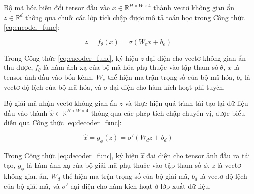 Bộ mã hóa biến đổi tensor đầu vào $x \in \mathbb{R}^{H \times W \times 4}$ thành vectơ không gian ẩn $z \in \mathbb{R}^d$ thông qua chuỗi các lớp tích chập được mô tả toán học trong Công thức \ref{eq:encoder_func}:

\begin{equation}
z = f_{\theta}(x) = \sigma(W_e x + b_e)
\label{eq:encoder_func}
\end{equation}

Trong Công thức \ref{eq:encoder_func}, ký hiệu $z$ đại diện cho vectơ không gian ẩn thu được, $f_{\theta}$ là hàm ánh xạ của bộ mã hóa phụ thuộc vào tập tham số $\theta$, $x$ là tensor ảnh đầu vào bốn kênh, $W_e$ thể hiện ma trận trọng số của bộ mã hóa, $b_e$ là vectơ độ lệch của bộ mã hóa, và $\sigma$ đại diện cho hàm kích hoạt phi tuyến.

Bộ giải mã nhận vectơ không gian ẩn $z$ và thực hiện quá trình tái tạo lại dữ liệu đầu vào thành $\hat{x} \in \mathbb{R}^{H \times W \times 4}$ thông qua các phép tích chập chuyển vị, được biểu diễn qua Công thức \ref{eq:decoder_func}:

\begin{equation}
\hat{x} = g_{\phi}(z) = \sigma'(W_d z + b_d)
\label{eq:decoder_func}
\end{equation}

Trong Công thức \ref{eq:decoder_func}, ký hiệu $\hat{x}$ đại diện cho tensor ảnh đầu ra tái tạo, $g_{\phi}$ là hàm ánh xạ của bộ giải mã phụ thuộc vào tập tham số $\phi$, $z$ là vectơ không gian ẩn, $W_d$ thể hiện ma trận trọng số của bộ giải mã, $b_d$ là vectơ độ lệch của bộ giải mã, và $\sigma'$ đại diện cho hàm kích hoạt ở lớp xuất dữ liệu.

